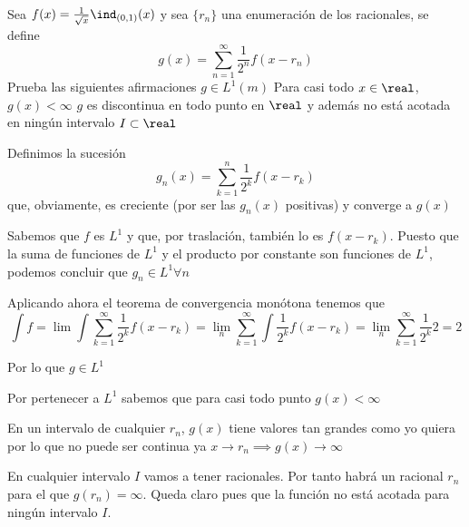 \begin{problem}[14]
Sea $f(x) = \frac{1}{\sqrt{x}}\ind_{(0,1)}(x)$ y sea $\{r_n\}$ una enumeración de los racionales, se define
\[g(x)=\sum_{n=1}^{\infty}\frac{1}{2^n}f(x-r_n)\]
Prueba las siguientes afirmaciones
\ppart $g \in L^1(m)$
\ppart Para casi todo $x \in \real$, $g(x) < \infty$
\ppart $g$ es discontinua en todo punto en $\real$ y además no está acotada en ningún intervalo $I \subset \real$

\solution
\spart
Definimos la sucesión
\[g_n(x) = \sum_{k=1}^{n} \frac{1}{2^k}f(x-r_k)\]
que, obviamente, es creciente (por ser las $g_n(x)$ positivas) y converge a $g(x)$

Sabemos que $f$ es $L^1$ y que, por traslación, también lo es $f(x-r_k)$. Puesto que la suma de funciones de $L^1$ y el producto por constante son funciones de $L^1$, podemos concluir que $g_n \in L^1 \forall n$

Aplicando ahora el teorema de convergencia monótona tenemos que
\[\int f = \lim \int \sum_{k=1}^{\infty} \frac{1}{2^k}f(x-r_k) = \lim_n  \sum_{k=1}^{\infty} \int \frac{1}{2^k}f(x-r_k) =\lim_n  \sum_{k=1}^{\infty}\frac{1}{2^k} 2 = 2\]

Por lo que $g \in L^1$

\spart
Por pertenecer a $L^1$ sabemos que para casi todo punto $g(x) < \infty$

\spart

En un intervalo de cualquier $r_n$, $g(x)$ tiene valores tan grandes como yo quiera por lo que no puede ser continua ya $x\to r_n \implies g(x) \to \infty$

En cualquier intervalo $I$ vamos a tener racionales. Por tanto habrá un racional $r_n$ para el que $g(r_n)=\infty$. Queda claro pues que la función no está acotada para ningún intervalo $I$.
\end{problem}


